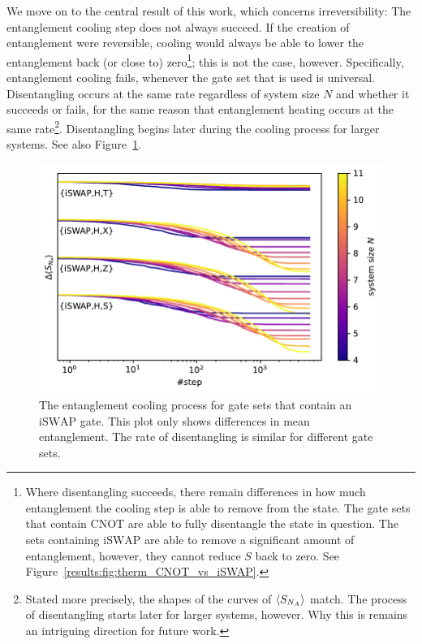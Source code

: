 \documentclass[reprint,amsmath,amssymb,aps,prb,nofootinbib]{revtex4-2}
\begin{document}
    We move on to the central result of this work, which concerns irreversibility: The entanglement cooling step
    does not always succeed. If the creation of entanglement were reversible, cooling would always be able to lower
    the entanglement back (or close to) zero\footnote{Where disentangling succeeds, there remain differences in how
    much entanglement the cooling step is able to remove from the state. The gate sets that contain $\text{CNOT}$ are
    able to fully disentangle the state in question. The sets containing $\text{iSWAP}$ are able to remove a
    significant amount of entanglement, however, they cannot reduce $S$ back to zero. See
    Figure~\ref{results:fig:therm_CNOT_vs_iSWAP}.}; this is not the case, however. Specifically, entanglement cooling fails,
    whenever the gate set that is used is universal. Disentangling occurs at the same rate regardless of system
    size $N$ and whether it succeeds or fails, for the same reason that entanglement heating occurs at the same
    rate\footnote{Stated more precisely, the shapes of the curves of $\braket{S_{N_A}}$ match. The process of disentangling
    starts later for larger systems, however. Why this is remains an intriguing direction for future work.}.
    Disentangling begins later during the cooling process for larger systems. See also Figure~\ref{results:fig:therm_spped_iSWAP}.

    \begin{figure}[htb]
        \includegraphics[width=\columnwidth]{plots/therm_speed_iSWAP.pdf}
        \caption{The entanglement cooling process for gate sets that contain an $\text{iSWAP}$ gate. This plot only shows differences
        in mean entanglement. The rate of disentangling is similar for different gate sets.}
        \label{results:fig:therm_spped_iSWAP}
    \end{figure}
\end{document}
